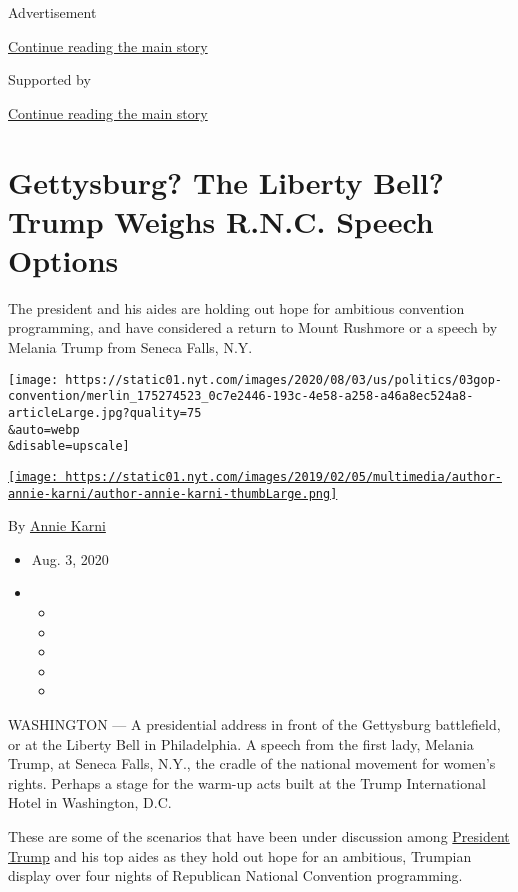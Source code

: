 Advertisement

\protect\hyperlink{after-top}{Continue reading the main story}

Supported by

\protect\hyperlink{after-sponsor}{Continue reading the main story}

\hypertarget{gettysburg-the-liberty-bell-trump-weighs-rnc-speech-options}{%
\section{Gettysburg? The Liberty Bell? Trump Weighs R.N.C. Speech
Options}\label{gettysburg-the-liberty-bell-trump-weighs-rnc-speech-options}}

The president and his aides are holding out hope for ambitious
convention programming, and have considered a return to Mount Rushmore
or a speech by Melania Trump from Seneca Falls, N.Y.

\texttt{[image: https://static01.nyt.com/images/2020/08/03/us/politics/03gop-convention/merlin\_175274523\_0c7e2446-193c-4e58-a258-a46a8ec524a8-articleLarge.jpg?quality=75\\\&auto=webp\\\&disable=upscale]}

\href{https://www.nytimes.com/by/annie-karni}{\texttt{[image: https://static01.nyt.com/images/2019/02/05/multimedia/author-annie-karni/author-annie-karni-thumbLarge.png]}}

By \href{https://www.nytimes.com/by/annie-karni}{Annie Karni}

\begin{itemize}
\item
  Aug. 3, 2020
\item
  \begin{itemize}
  \item
  \item
  \item
  \item
  \item
  \end{itemize}
\end{itemize}

WASHINGTON --- A presidential address in front of the Gettysburg
battlefield, or at the Liberty Bell in Philadelphia. A speech from the
first lady, Melania Trump, at Seneca Falls, N.Y., the cradle of the
national movement for women's rights. Perhaps a stage for the warm-up
acts built at the Trump International Hotel in Washington, D.C.

These are some of the scenarios that have been under discussion among
\href{https://www.nytimes.com/interactive/2020/us/elections/donald-trump.html}{President
Trump} and his top aides as they hold out hope for an ambitious,
Trumpian display over four nights of Republican National Convention
programming.

